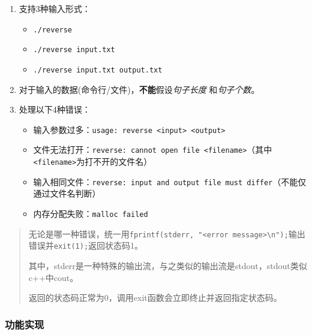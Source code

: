 \documentclass[
]{article}
\begin{document}
\begin{enumerate}
  \def\labelenumi{\arabic{enumi}.}
  \item
        支持3种输入形式：

        \begin{itemize}
          \item
                \texttt{./reverse}
          \item
                \texttt{./reverse\ input.txt}
          \item
                \texttt{./reverse\ input.txt\ output.txt}
        \end{itemize}
  \item
        对于输入的数据(命令行/文件)，\textbf{不能}假设\emph{句子长度}
        和\emph{句子个数}。
  \item
        处理以下4种错误：

        \begin{itemize}
          \item
                输入参数过多：\texttt{usage:\ reverse\ \textless{}input\textgreater{}\ \textless{}output\textgreater{}}
          \item
                文件无法打开：\texttt{reverse:\ cannot\ open\ file\ \textquotesingle{}\textless{}filename\textgreater{}\textquotesingle{}}（其中\texttt{\textless{}filename\textgreater{}}为打不开的文件名）
          \item
                输入相同文件：\texttt{reverse:\ input\ and\ output\ file\ must\ differ}（不能仅通过文件名判断）
          \item
                内存分配失败：\texttt{malloc\ failed}
        \end{itemize}
\end{enumerate}

\begin{quote}
  无论是哪一种错误，统一用\texttt{fprintf(stderr,\ "\textless{}error\ message\textgreater{}\textbackslash{}n");}输出错误并\texttt{exit(1);}返回状态码1。

  其中，stderr是一种特殊的输出流，与之类似的输出流是stdout，stdout类似c++中cout。

  返回的状态码正常为0，调用exit函数会立即终止并返回指定状态码。
\end{quote}

\subsubsection{功能实现}\label{ux529fux80fdux5b9eux73b0}
\end{document}
